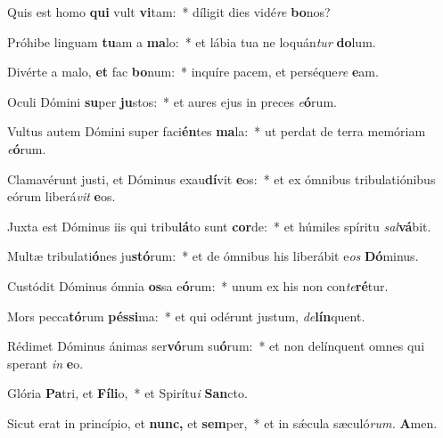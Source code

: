 \item Quis est homo \textbf{qui} vult \textbf{vi}tam:~* díligit dies vidé\tinyhspace\textit{re} \textbf{bo}nos?
\item Próhibe linguam \textbf{tu}am a \textbf{ma}lo:~* et lábia tua ne loquán\textit{tur} \textbf{do}lum.
\item Divérte a malo, \textbf{et} fac \textbf{bo}num:~* inquíre pacem, et perséque\tinyhspace\textit{re} \textbf{e}am.
\item Oculi Dómini \textbf{su}per \textbf{ju}stos:~* et aures ejus in preces \textit{e}\textbf{ó}rum.
\item Vultus autem Dómini super faci\textbf{én}tes \textbf{ma}la:~* ut perdat de terra memóriam \textit{e}\textbf{ó}rum.
\item Clamavérunt justi, et Dóminus exau\textbf{dí}vit \textbf{e}os:~* et ex ómnibus tribulatiónibus eórum liberá\textit{vit} \textbf{e}os.
\item Juxta est Dóminus iis qui tribu\textbf{lá}to sunt \textbf{cor}de:~* et húmiles spíritu \textit{sal}\textbf{vá}bit.
\item Multæ tribulati\textbf{ó}nes ju\textbf{stó}rum:~* et de ómnibus his liberábit e\tinyhspace\textit{os} \textbf{Dó}minus.
\item Custódit Dóminus ómnia \textbf{os}sa e\textbf{ó}rum:~* unum ex his non con\tinyhspace\textit{te}\textbf{ré}tur.
\item Mors pecca\textbf{tó}rum \textbf{pés}\textbf{si}ma:~* et qui odérunt ju\-stum, \textit{de}\textbf{lín}quent.
\item Rédimet Dóminus ánimas ser\textbf{vó}rum su\textbf{ó}rum:~* et non delínquent o\-mnes qui sperant \textit{in} \textbf{e}o.
\item Glória \textbf{Pa}tri, et \textbf{Fí}\textbf{li}o,~* et Spirítu\textit{i} \textbf{San}cto.
\item Sicut erat in princípio, et \textbf{nunc,} et \textbf{sem}per,~* et in sǽcula sæculó\textit{rum.} \textbf{A}men.

